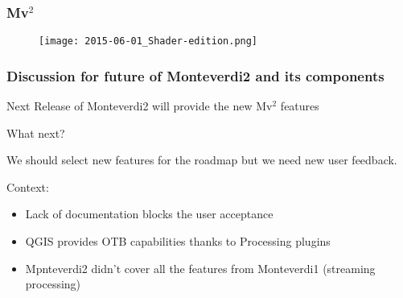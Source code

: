 \documentclass[8pt]{beamer}
\begin{document}

\begin{frame}
\frametitle{Mv$^{2}$}
\begin{figure}[hbtp]
    \centering
    \texttt{[image: 2015-06-01\_Shader-edition.png]} 
\end{figure}
\end{frame}


\begin{frame}
\frametitle{Discussion for future of Monteverdi2 and its components}
Next Release of Monteverdi2 will provide the new Mv$^{2}$ features

What next?

We should select new features for the roadmap but we need new user feedback. 

Context: 
\begin{itemize}
 \item Lack of documentation blocks the user acceptance
 \item QGIS provides OTB capabilities thanks to Processing plugins 
 \item Mpnteverdi2 didn't cover all the features from Monteverdi1 (streaming processing)
\end{itemize}
\end{frame}
\end{document}
